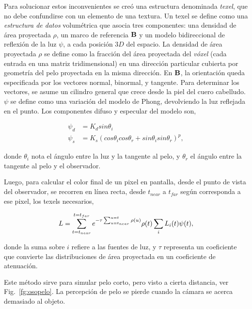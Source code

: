 Para solucionar estos inconvenientes se creó una estructura denominada {\em texel}, que no debe confundirse con un elemento de una textura.
Un texel se define como una {\em estructura de datos} volumétrica que asocia tres componentes: una densidad de área proyectada $\rho$, un marco de referencia $\bold{B}$ y un modelo bidireccional de reflexión de la luz $\psi$, a cada posición $3D$ del espacio.
La densidad de área proyectada $\rho$ se define como la fracción del área proyectada del {\em vóxel} (cada entrada en una matriz tridimensional) en una dirección particular cubierta por geometría del pelo proyectada en la misma dirección.
En $\bold{B}$, la orientación queda especificada por los vectores normal, binormal, y tangente.
Para determinar los vectores, se asume un cilindro general que crece desde la piel del cuero cabelludo.
$\psi$ se define como una variación del modelo de Phong, devolviendo la luz reflejada en el punto.
Los componentes difuso y especular del modelo son,

\begin{align*}
\psi_{d} &= K_{d} sin \theta_{i}\\
\psi_{s} &= K_{s} (cos \theta_{i} cos \theta_{r} + sin \theta_{i} sin \theta_{r})^{p},
\end{align*}

donde $\theta_{i}$ nota el ángulo entre la luz y la tangente al pelo, y $\theta_{r}$ el ángulo entre la tangente al pelo y el observador.

Luego, para calcular el color final de un pixel en pantalla, desde el punto de vista del observador, se recorren en línea recta, desde $t_{near}$ a $t_{far}$ según corresponda a ese pixel, los texels necesarios,

$$L = \sum_{t=t_{near}}^{t=t_{far}} {e^{-\tau \sum_{u=t_{near}}^{u=t} \rho(u)} \rho(t) \sum_{i} L_{i}(t) \bold{\psi}(t)},$$

donde la suma sobre $i$ refiere a las fuentes de luz, y $\tau$ representa un coeficiente que convierte las distribuciones de área proyectada en un coeficiente de atenuación.

Este método sirve para simular pelo corto, pero visto a cierta distancia, ver Fig.~\ref{fg:osopelo}.
La percepción de pelo se pierde cuando la cámara se acerca demasiado al objeto.

